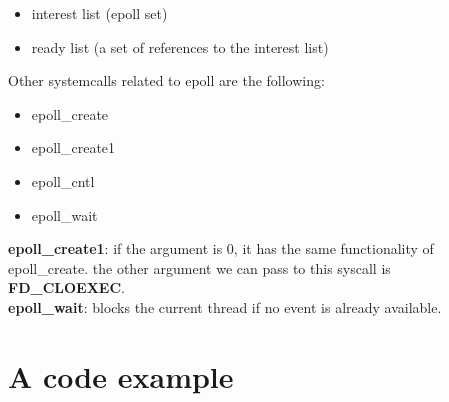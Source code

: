 \documentclass[10pt,a4paper]{article}
\newcommand{\definition}[2]{\textbf{#1}: #2}
\begin{document}
\begin{itemize}
	\item interest list (epoll set)
	\item ready list (a set of references to the interest list)
\end{itemize}
Other systemcalls related to epoll are the following:
\begin{itemize}
	\item epoll\_create
	\item epoll\_create1
	\item epoll\_cntl
	\item epoll\_wait
\end{itemize}
\definition{epoll\_create1}{if the argument is 0, it has the same functionality of epoll\_create. the other argument we can pass to this syscall is \textbf{FD\_CLOEXEC}}.\\
\definition{epoll\_wait}{blocks the current thread if no event is already available.}

\section*{A code example}
\inputminted{rust}{fig03.rs}
\end{document}
